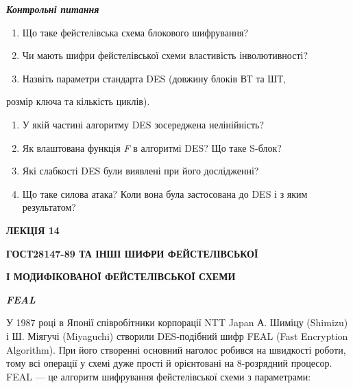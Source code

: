 \bigskip

{\centering\bfseries\itshape
Контрольні питання
\par}


\bigskip


\bigskip

\liststyleWWviiiNumxviii
\begin{enumerate}
\item Що таке фейстелівська схема блокового шифрування? 
\item Чи мають шифри фейстелівської схеми властивість інволютивності?
\item Назвіть параметри стандарта DES (довжину блоків ВТ та ШТ, 
\end{enumerate}
розмір ключа та кількість циклів).

\liststyleWWviiiNumxviii
\setcounter{saveenum}{\value{enumi}}
\begin{enumerate}
\setcounter{enumi}{\value{saveenum}}
\item У якій частині алгоритму DES зосереджена нелінійність?
\item Як влаштована функція \textit{F}\textit{ }в алгоритмі DES? Що таке
S{}-блок?
\item Які слабкості DES були виявлені при його дослідженні?
\item Що таке силова атака? Коли вона була застосована до DES і з яким
результатом?
\end{enumerate}

\bigskip


\bigskip

{\bfseries
ЛЕКЦІЯ  14}


\bigskip

{\centering\bfseries
ГОСТ28147-89  ТА ІНШІ ШИФРИ  ФЕЙСТЕЛІВСЬКОЇ 
\par}

{\centering\bfseries
І  МОДИФІКОВАНОЇ  ФЕЙСТЕЛІВСЬКОЇ  СХЕМИ
\par}


\bigskip


\bigskip

{\centering\bfseries\itshape
FEAL
\par}


\bigskip

У 1987 році в Японії співробітники корпорації NTT Japan А. Шиміцу (Shimizu) і Ш.
Міягучі (Miyaguchi) створили DES-подібний шифр FEAL (Fast Encryption
Algorithm). При його створенні основний наголос робився на швидкості роботи,
тому всі операції у схемі дуже прості й орієнтовані на 8-розрядний процесор.
FEAL  --- це алгоритм шифрування фейстелівської схеми з параметрами:

